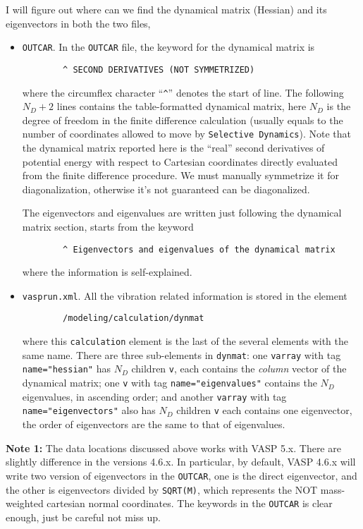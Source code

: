 \documentclass[a4paper,notitlepage,preprint]{revtex4-1}
\begin{document}
I will figure out where can we find the dynamical matrix (Hessian) and its eigenvectors in both the two files,
\begin{itemize}
	\item \verb|OUTCAR|. In the \verb|OUTCAR| file, the keyword for the dynamical matrix is
	\begin{verbatim}
		^ SECOND DERIVATIVES (NOT SYMMETRIZED)		
	\end{verbatim}
	where the circumflex character ``\verb|^|'' denotes the start of line. The following $N_D+2$ lines contains the table-formatted dynamical matrix, here $N_D$ is the degree of freedom in the finite difference calculation (usually equals to the number of coordinates allowed to move by \verb|Selective Dynamics|). Note that the dynamical matrix reported here is the ``real'' second derivatives of potential energy with respect to Cartesian coordinates directly evaluated from the finite difference procedure. We must manually symmetrize it for diagonalization, otherwise it's not guaranteed can be diagonalized.
	
	The eigenvectors and eigenvalues are written just following the dynamical matrix section, starts from the keyword
	\begin{verbatim}
		^ Eigenvectors and eigenvalues of the dynamical matrix
	\end{verbatim}
	where the information is self-explained.
	
	\item \verb|vasprun.xml|. All the vibration related information is stored in the element
	\begin{verbatim}
		/modeling/calculation/dynmat
	\end{verbatim}
	where this \verb|calculation| element is the last of the several elements with the same name. There are three sub-elements in \verb|dynmat|: one \verb|varray| with tag \verb|name="hessian"| has $N_D$ children \verb|v|, each contains the {\em column} vector of the dynamical matrix; one \verb|v| with tag \verb|name="eigenvalues"| contains the $N_D$ eigenvalues, in ascending order; and another \verb|varray| with tag \verb|name="eigenvectors"| also has $N_D$ children \verb|v| each contains one eigenvector, the order of eigenvectors are the same to that of eigenvalues.
\end{itemize}

{\color{red} {\bf Note 1:}} The data locations discussed above works with VASP 5.x. There are slightly difference in the versions 4.6.x. In particular, by default, VASP 4.6.x will write two version of eigenvectors in the \verb|OUTCAR|, one is the direct eigenvector, and the other is eigenvectors divided by \verb|SQRT(M)|, which represents the NOT mass-weighted cartesian normal coordinates. The keywords in the \verb|OUTCAR| is clear enough, just be careful not miss up.
\vspace{1em}
\end{document}
